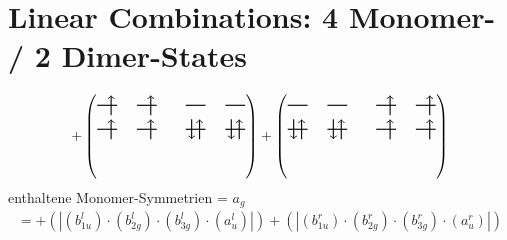 \documentclass{article}
\begin{document}
\newpage \section{Linear Combinations: 4 Monomer- / 2 Dimer-States}
\[ +\left(\text{\begin{tikzpicture}
    \draw[thick] (0,0) -- (0.5,0); %
    \draw[thick] (1,0) -- (1.5,0); %
    \draw[thick] (0,-0.6) -- (0.5,-0.6); %
    \draw[thick] (1,-0.6) -- (1.5,-0.6); %
\draw[->, thick] (0.35, -0.25) -- (0.35, 0.25); 
\draw[->, thick] (1.35, -0.25) -- (1.35, 0.25); 
\draw[-> , thick] (0.35, -0.85) -- (0.35, -0.35); 
 \draw[-> , thick] (1.35, -0.85) -- (1.35, -0.35); 
\end{tikzpicture}\qquad \begin{tikzpicture}
    \draw[thick] (0,0) -- (0.5,0); %
    \draw[thick] (1,0) -- (1.5,0); %
    \draw[thick] (0,-0.6) -- (0.5,-0.6); %
    \draw[thick] (1,-0.6) -- (1.5,-0.6); %
\draw[-> , thick] (0.35, -0.85) -- (0.35, -0.35); 
\draw[<- , thick] (0.15, -0.85) -- (0.15, -0.35); 
 \draw[-> , thick] (1.35, -0.85) -- (1.35, -0.35); 
\draw[<- , thick] (1.15, -0.85) -- (1.15, -0.35); 
\end{tikzpicture}}\right)+\left(\text{\begin{tikzpicture}
    \draw[thick] (0,0) -- (0.5,0); %
    \draw[thick] (1,0) -- (1.5,0); %
    \draw[thick] (0,-0.6) -- (0.5,-0.6); %
    \draw[thick] (1,-0.6) -- (1.5,-0.6); %
\draw[-> , thick] (0.35, -0.85) -- (0.35, -0.35); 
\draw[<- , thick] (0.15, -0.85) -- (0.15, -0.35); 
 \draw[-> , thick] (1.35, -0.85) -- (1.35, -0.35); 
\draw[<- , thick] (1.15, -0.85) -- (1.15, -0.35); 
\end{tikzpicture}\qquad \begin{tikzpicture}
    \draw[thick] (0,0) -- (0.5,0); %
    \draw[thick] (1,0) -- (1.5,0); %
    \draw[thick] (0,-0.6) -- (0.5,-0.6); %
    \draw[thick] (1,-0.6) -- (1.5,-0.6); %
\draw[->, thick] (0.35, -0.25) -- (0.35, 0.25); 
\draw[->, thick] (1.35, -0.25) -- (1.35, 0.25); 
\draw[-> , thick] (0.35, -0.85) -- (0.35, -0.35); 
 \draw[-> , thick] (1.35, -0.85) -- (1.35, -0.35); 
\end{tikzpicture}}\right)\]enthaltene Monomer-Symmetrien = $a_{g}$\begin{multline*}=+\left(\left|(b_{1u}^{l}) \cdot (b_{2g}^{l}) \cdot (b_{3g}^{l}) \cdot (a_{u}^{l})\right|\right)+\left(\left|(b_{1u}^{r}) \cdot (b_{2g}^{r}) \cdot (b_{3g}^{r}) \cdot (a_{u}^{r})\right|\right)\end{multline*}
\end{document}
